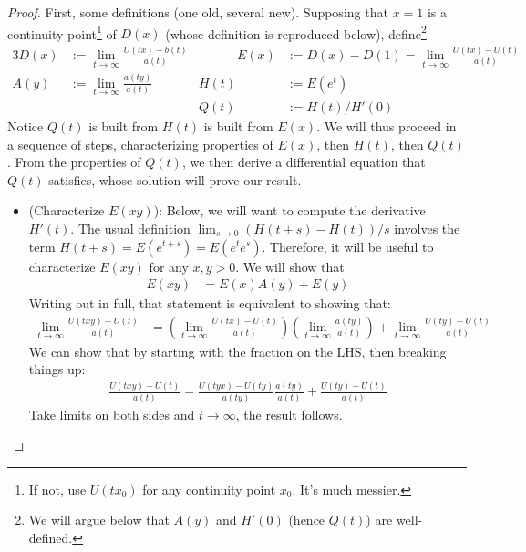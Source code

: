 \documentclass[12pt]{article}
\theoremstyle{plain}
\theoremstyle{definition}
\theoremstyle{remark}
\newcommand{\ra}{\rightarrow}
\newcommand{\limt}{\lim_{t\rightarrow\infty}}
\begin{document}
\begin{proof}
First, some definitions (one old, several new).
Supposing that $x=1$ is a continuity point\footnote{%
  If not, use $U(tx_0)$ for any continuity point $x_0$.
  It's much messier.
}
of $D(x)$ (whose definition is reproduced below), define\footnote{%
  We will argue below that $A(y)$ and $H'(0)$ (hence $Q(t)$) are
  well-defined.
}
\begin{alignat*}{3}
  D(x)&:= \limt\frac{U(tx)-b(t)}{a(t)}
  &
  \qquad
  \quad
  E(x)
  &:=
  D(x)-D(1)
  = \limt \frac{U(tx)-U(t)}{a(t)}
  \qquad
  \\
  A(y)
  &:= \limt \frac{a(ty)}{a(t)}
  \qquad
  &
  H(t)
  &:= E(e^t)
  \\
  &
  \qquad
  &
  Q(t)&:=H(t)/H'(0)
\end{alignat*}
Notice $Q(t)$ is built from $H(t)$ is built from $E(x)$.
We will thus proceed in a sequence of steps, characterizing properties
of $E(x)$, then $H(t)$, then $Q(t)$.
From the properties of $Q(t)$, we then derive a differential equation
that $Q(t)$ satisfies, whose solution will prove our result.
\begin{itemize}
  \item (Characterize $E(xy)$):
    Below, we will want to compute the derivative $H'(t)$.
    The usual definition $\lim_{s\ra0}(H(t+s)-H(t))/s$ involves the term
    $H(t+s)=E(e^{t+s})=E(e^t e^s)$. Therefore, it will be useful to
    characterize $E(xy)$ for any $x,y>0$. We will show that
    \begin{align*}
      E(xy)&=E(x)A(y)+E(y)
    \end{align*}
    Writing out in full, that statement is equivalent to showing that:
    \begin{align*}
      \limt
      \frac{U(txy)-U(t)}{a(t)}
      &=
      \left(
      \limt
      \frac{U(tx)-U(t)}{a(t)}
      \right)
      \left(
      \limt
      \frac{a(ty)}{a(t)}
      \right)
      +
      \limt
      \frac{U(ty)-U(t)}{a(t)}
    \end{align*}
    We can show that by starting with the fraction on the LHS, then
    breaking things up:
    \begin{align*}
      \frac{U(txy)-U(t)}{a(t)}
      =
      \frac{U(tyx)-U(ty)}{a(ty)}
      \frac{a(ty)}{a(t)}
      +
      \frac{U(ty)-U(t)}{a(t)}
    \end{align*}
    Take limits on both sides and $t\ra\infty$, the result follows.


\end{itemize}
\end{proof}
\end{document}
